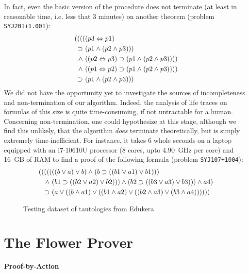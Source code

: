 In fact, even the basic version of the  procedure does not
terminate (at least in reasonable time, i.e. less that 3 minutes) on another
 theorem (problem \texttt{SYJ201+1.001}):
\begin{align*}
((((&(p3 \Leftrightarrow p1)\\
\supset ~&(p1 \land (p2 \land p3)))\\
\land ~&((p2 \Leftrightarrow p3) \supset (p1 \land (p2 \land p3))))\\
\land ~&((p1 \Leftrightarrow p2) \supset (p1 \land (p2 \land p3))))\\
\supset ~&(p1 \land (p2 \land p3)))
\end{align*}
We did not have the opportunity yet to investigate the sources of incompleteness
and non-termination of our algorithm. Indeed, the analysis of life traces on
formulas of this size is quite time-consuming, if not untractable for a human.
Concerning non-termination, one could hypothesize at this stage, although we
find this unlikely, that the algorithm \emph{does} terminate theoretically, but
is simply extremely time-inefficient. For instance, it takes 6 whole seconds on a laptop
equipped with an i7-10610U processor (8 cores, upto 4.90~GHz per core) and 16~GB
of RAM to find a proof of the following formula (problem \texttt{SYJ107+1004}):
\begin{align*}
  (((((&((b \lor a) \lor b) \land (b \supset ((b1 \lor a1) \lor b1)))\\
  \land ~&(b1 \supset ((b2 \lor a2) \lor b2))) \land (b2 \supset ((b3 \lor a3) \lor b3))) \land a4)\\
  \supset ~&(a \lor ((b \land a1) \lor ((b1 \land a2) \lor ((b2 \land a3) \lor (b3 \land a4))))))
\end{align*}

\begin{figure*}
  
  \caption{Testing dataset of tautologies from Edukera}
\end{figure*}

\section{The Flower Prover}

\paragraph{Proof-by-Action}

